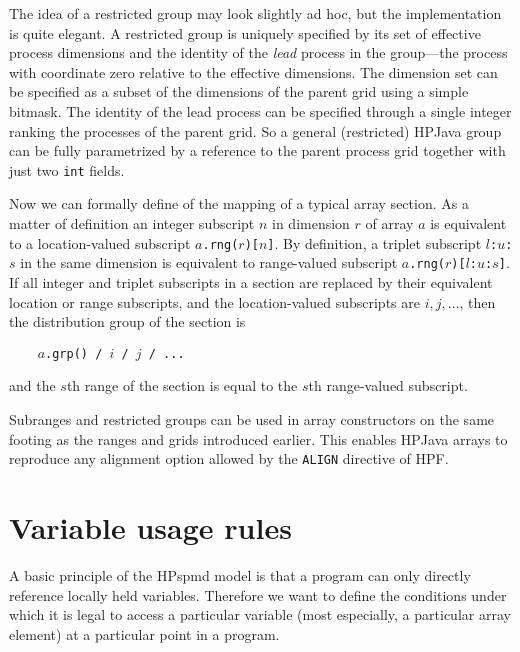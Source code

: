 \documentclass{article}
\begin{document}
The idea of a restricted group may look slightly ad hoc, but the
implementation is quite elegant.  A restricted group is uniquely
specified by its set of effective process dimensions and the identity
of the {\em lead} process in the group---the process with coordinate
zero relative to the effective dimensions.  The dimension set can be
specified as a subset of the dimensions of the parent grid using a
simple bitmask.  The identity of the lead process can be specified
through a single integer ranking the processes of the parent grid.  So
a general (restricted) HPJava group can be fully parametrized by a
reference to the parent process grid together with just two {\tt int}
fields.

Now we can formally define of the mapping
of a typical array section.  As a matter of
definition an integer subscript $n$ in dimension $r$ of
array $a$ is equivalent to a location-valued subscript
$a${\tt .rng(}$r${\tt )[}$n${\tt ]}.
By definition, a triplet subscript $l${\tt :}$u${\tt :}$s$ in the same
dimension is equivalent to range-valued subscript
$a${\tt .rng(}$r${\tt )[}$l${\tt :}$u${\tt :}$s${\tt ]}.
If all integer and triplet subscripts in a section are replaced by their
equivalent location or range subscripts, and the
location-valued subscripts are $i, j, \ldots$, then the
distribution group of the section is
\small
\begin{tabbing}
\verb$    $$a$\verb$.grp() / $$i$\verb$ / $$j$\verb$ / ...$
\end{tabbing}
\normalsize
and the $s$th range of the section is equal to the $s$th range-valued
subscript.

Subranges and restricted groups can be used in array constructors on
the same footing as the ranges and grids introduced earlier.
This enables HPJava arrays to reproduce any alignment option
allowed by the {\tt ALIGN} directive of HPF.

\section{Variable usage rules\label{sec:usage}}

A basic principle of the HPspmd model is that a program can only
directly reference locally held variables.  Therefore
we want to define the conditions under which it is legal to
access a particular variable (most especially, a particular
array element) at a particular point in a program.
\end{document}

